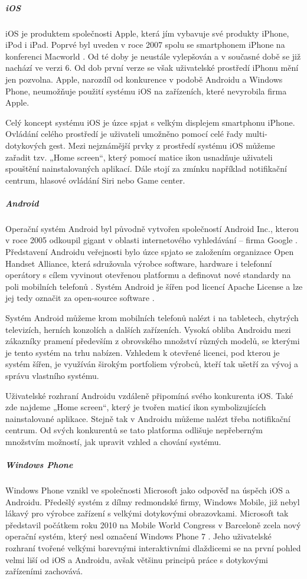 \subparagraph{iOS}
iOS je produktem společnosti Apple, která jím vybavuje své produkty iPhone, iPod i iPad. Poprvé byl uveden v roce 2007 spolu se smartphonem iPhone na konferenci Macworld \cite{apple_unveils_iPhone}. Od té doby je neustále vylepšován a v současné době se již nachází ve verzi 6. Od dob první verze se však uživatelské prostředí iPhonu mění jen pozvolna. Apple, narozdíl od konkurence v podobě Androidu a Windows Phone, neumožňuje použití systému iOS na zařízeních, které nevyrobila firma Apple.

Celý koncept systému iOS je úzce spjat s velkým displejem smartphonu iPhone. Ovládání celého prostředí je uživateli umožněno pomocí celé řady multi-dotykových gest. Mezi nejznámější prvky z prostředí systému iOS můžeme zařadit tzv. „Home screen“, který pomocí matice ikon usnadňuje uživateli spouštění nainstalovaných aplikací. Dále stojí za zmínku například notifikační centrum, hlasové ovládání Siri nebo Game center.

\subparagraph{Android}
Operační systém Android byl původně vytvořen společností Android Inc., kterou v roce 2005 odkoupil gigant v oblasti internetového vyhledávání – firma Google \cite{google_buys_android}. Představení Androidu veřejnosti bylo úzce spjato se založením organizace Open Handset Alliance, která sdružovala výrobce software, hardware i telefonní operátory s cílem vyvinout otevřenou platformu a definovat nové standardy na poli mobilních telefonů \cite{android_announce}. Systém Android je šířen pod licencí Apache License a lze jej tedy označit za open-source software \cite{android_overview}.

Systém Android můžeme krom mobilních telefonů nalézt i na tabletech, chytrých televizích, herních konzolích a dalších zařízeních. Vysoká obliba Androidu mezi zákazníky pramení především z obrovského množství různých modelů, se kterými je tento systém na trhu nabízen. Vzhledem k otevřené licenci, pod kterou je systém šířen, je využíván širokým portfoliem výrobců, kteří tak ušetří za vývoj a správu vlastního systému.

Uživatelské rozhraní Androidu vzdáleně připomíná svého konkurenta iOS. Také zde najdeme „Home screen“, který je tvořen maticí ikon symbolizujících nainstalované aplikace. Stejně tak v Androidu můžeme nalézt třeba notifikační centrum. Od svých konkurentů se tato platforma odlišuje nepřeberným množstvím možností, jak upravit vzhled a chování systému.

\subparagraph{Windows Phone}
Windows Phone vznikl ve společnosti Microsoft jako odpověď na úspěch iOS a Androidu. Předešlý systém z dílmy redmondské firmy, Windows Mobile, již nebyl lákavý pro výrobce zařízení s velkými dotykovými obrazovkami. Microsoft tak představil počátkem roku 2010 na Mobile World Congress v Barceloně zcela nový operační systém, který nesl označení Windows Phone 7 \cite{ms_announce_wp}. Jeho uživatelské rozhraní tvořené velkými barevnými interaktivními dlaždicemi se na první pohled velmi liší od iOS a Androidu, avšak většinu principů práce s dotykovými zařízeními zachovává. 

